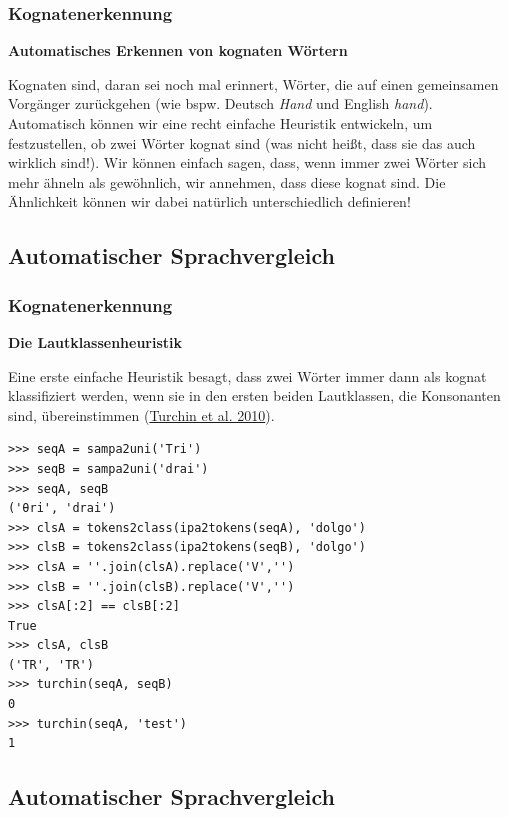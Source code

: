 \subsubsection{\texorpdfstring{{Kognatenerkennung}}{Kognatenerkennung}}

\textbf{Automatisches Erkennen von kognaten Wörtern}

Kognaten sind, daran sei noch mal erinnert, Wörter, die auf einen
gemeinsamen Vorgänger zurückgehen (wie bspw. Deutsch \emph{Hand} und
English \emph{hand}). Automatisch können wir eine recht einfache
Heuristik entwickeln, um festzustellen, ob zwei Wörter kognat sind (was
nicht heißt, dass sie das auch wirklich sind!). Wir können einfach
sagen, dass, wenn immer zwei Wörter sich mehr ähneln als gewöhnlich, wir
annehmen, dass diese kognat sind. Die Ähnlichkeit können wir dabei
natürlich unterschiedlich definieren!

\subsection{\texorpdfstring{{Automatischer
Sprachvergleich}}{Automatischer Sprachvergleich}}

\subsubsection{\texorpdfstring{{Kognatenerkennung}}{Kognatenerkennung}}

\textbf{Die Lautklassenheuristik}

Eine erste einfache Heuristik besagt, dass zwei Wörter immer dann als
kognat klassifiziert werden, wenn sie in den ersten beiden Lautklassen,
die Konsonanten sind, übereinstimmen
(\href{http://bibliography.lingpy.org?key=Turchin2010}{Turchin et al.
2010}).

\begin{verbatim}
>>> seqA = sampa2uni('Tri')
>>> seqB = sampa2uni('drai')
>>> seqA, seqB 
('θri', 'drai')
>>> clsA = tokens2class(ipa2tokens(seqA), 'dolgo')
>>> clsB = tokens2class(ipa2tokens(seqB), 'dolgo')
>>> clsA = ''.join(clsA).replace('V','')
>>> clsB = ''.join(clsB).replace('V','')
>>> clsA[:2] == clsB[:2]
True
>>> clsA, clsB
('TR', 'TR')
>>> turchin(seqA, seqB)
0
>>> turchin(seqA, 'test')
1
\end{verbatim}

\subsection{\texorpdfstring{{Automatischer
Sprachvergleich}}{Automatischer Sprachvergleich}}

